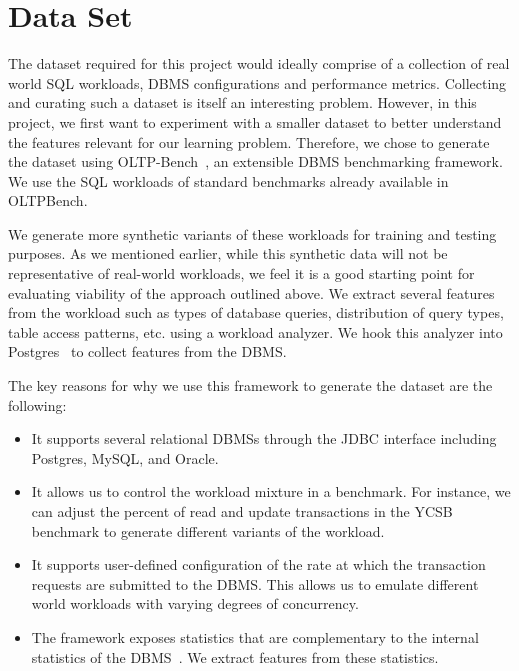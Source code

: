 \section{Data Set} \label{sec:data_set}

The dataset required for this project would ideally comprise of a 
collection of real world SQL workloads, DBMS configurations and performance
metrics. Collecting and curating such a dataset is itself an interesting
problem.
However, in this project, we first want to experiment with a smaller dataset
to better understand the features relevant for our learning problem.
Therefore, we chose to generate the dataset using
OLTP-Bench~\citep{oltpbench14}, an extensible DBMS benchmarking framework.
We use the SQL workloads of standard benchmarks already available
in OLTPBench. 

We generate more synthetic variants of these workloads for training and
testing purposes. As we mentioned earlier, while this synthetic data will not be
representative of real-world workloads, we feel it is a good starting point for
evaluating viability of the approach outlined above.
We extract several features from the workload such as types of database queries,
distribution of query types, table access patterns, etc. using 
a workload analyzer. We hook this analyzer into Postgres~\citep{postgres91} to collect 
features from the DBMS.

The key reasons for why we use this framework to generate the dataset 
are the following:

\begin{itemize}
  \item It supports several relational DBMSs through the JDBC interface
  including Postgres, MySQL, and Oracle.
  \item It allows us to control the workload mixture in a benchmark. For
  instance, we can adjust the percent of read and update transactions in 
  the YCSB~\citep{ycsb} benchmark to generate different variants of the workload.
  \item It supports user-defined configuration of the rate at which the
  transaction requests are submitted to the DBMS. This allows us to emulate
  different world workloads with varying degrees of concurrency.
  \item The framework exposes statistics that are complementary to the 
  internal statistics of the DBMS~\citep{postgres14}. We extract features from
  these statistics.
\end{itemize}

